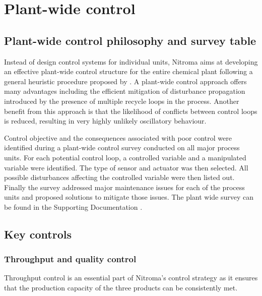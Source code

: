 \section{Plant-wide control}

\subsection{Plant-wide control philosophy and survey table}%

Instead of design control systems for individual units, Nitroma aims at developing an effective plant-wide control structure for the entire chemical plant following a general heuristic procedure proposed by \textcite{}. A plant-wide control approach offers many advantages including the efficient mitigation of disturbance propagation introduced by the presence of multiple recycle loops in the process. Another benefit from this approach is that the likelihood of conflicts between control loops is reduced, resulting in very highly unlikely  oscillatory behaviour. 

Control objective and the consequences associated with poor control were identified during a plant-wide control survey conducted on all major process units. For each potential control loop, a controlled variable and a manipulated variable were identified. The type of sensor and actuator was then selected. All possible disturbances affecting the controlled variable were then listed out. Finally the survey addressed major maintenance issues for each of the process units and proposed solutions to mitigate those issues. The plant wide survey can be found in the Supporting Documentation .


\subsection{Key controls}%

\subsubsection{Throughput and quality control}
Throughput control is an essential part of Nitroma's control strategy as it ensures that the production capacity of the three products can be consistently met. 

